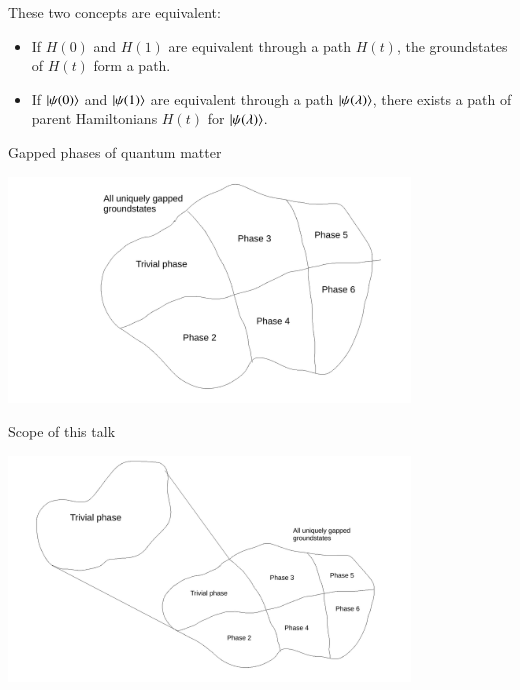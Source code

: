 \documentclass{beamer}
\begin{document}
\begin{frame}
	These two concepts are equivalent:
	\begin{itemize}
		\item<2-> If $H(0)$ and $H(1)$ are equivalent through a path $H(t)$, the groundstates of $H(t)$ form a path.
		\item<3-> If $\ket{\psi(0)}$ and $\ket{\psi(1)}$ are equivalent through a path $\ket{\psi(\lambda)}$, there exists a path of parent Hamiltonians $H(t)$ for $\ket{\psi(\lambda)}$.
	\end{itemize}
\end{frame}

\begin{frame}{Gapped phases of quantum matter}
	\begin{center}
		\includegraphics[trim={6cm 0 2.5cm 0},clip,width=0.8\textwidth]{Figures/GappedPhasesOfQuantumMatter.pdf}
	\end{center}
\end{frame}

\begin{frame}{Scope of this talk}
	\begin{center}
		\includegraphics[trim={1.5cm 0 2cm 0},clip,width=0.8\textwidth]{Figures/TrivialGappedPhaseOfQuantumMatter.pdf}
	\end{center}
\end{frame}
\end{document}
